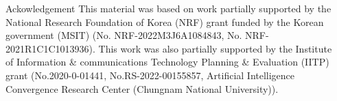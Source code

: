 \documentclass[final]{beamer}
\newlength{\sepwidth}
\newlength{\colwidth}
\newcommand{\separatorcolumn}{\begin{column}{\sepwidth}\end{column}}
\begin{document}
\begin{frame}[t]
\begin{columns}[t]
\begin{column}{\colwidth}








    
%     







\begin{block}{Ackowledgement}
   This material was based on work partially supported by the National Research Foundation of Korea (NRF) grant funded by the Korean government (MSIT) (No. NRF-2022M3J6A1084843, No. NRF-2021R1C1C1013936). This work was also partially supported by the Institute of Information \& communications Technology Planning \& Evaluation (IITP) grant (No.2020-0-01441, No.RS-2022-00155857, Artificial Intelligence Convergence Research Center (Chungnam National University)).
\end{block}














\end{column}
\separatorcolumn



\end{columns}
\end{frame}
\end{document}
